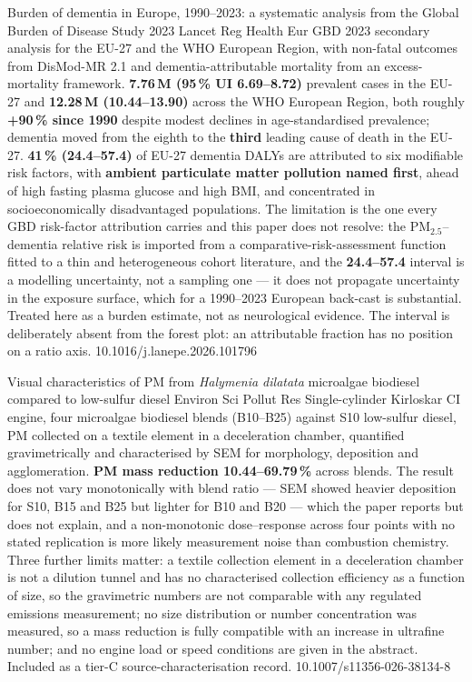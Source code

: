 \documentclass[10pt]{article}
\begin{document}
{Burden of dementia in Europe, 1990--2023: a systematic analysis from the Global Burden of Disease Study 2023}
{Lancet Reg Health Eur}
{GBD 2023 secondary analysis for the EU-27 and the WHO European Region, with non-fatal
outcomes from DisMod-MR 2.1 and dementia-attributable mortality from an excess-mortality
framework. \textbf{7.76\,M (95\,\% UI 6.69--8.72)} prevalent cases in the EU-27 and
\textbf{12.28\,M (10.44--13.90)} across the WHO European Region, both roughly
\textbf{+90\,\% since 1990} despite modest declines in age-standardised prevalence;
dementia moved from the eighth to the \textbf{third} leading cause of death in the EU-27.
\textbf{41\,\% (24.4--57.4)} of EU-27 dementia DALYs are attributed to six modifiable risk
factors, with \textbf{ambient particulate matter pollution named first}, ahead of high
fasting plasma glucose and high BMI, and concentrated in socioeconomically disadvantaged
populations. The limitation is the one every GBD risk-factor attribution carries and this
paper does not resolve: the PM$_{2.5}$--dementia relative risk is imported from a
comparative-risk-assessment function fitted to a thin and heterogeneous cohort literature,
and the \textbf{24.4--57.4} interval is a modelling uncertainty, not a sampling one --- it
does not propagate uncertainty in the exposure surface, which for a 1990--2023 European
back-cast is substantial. Treated here as a burden estimate, not as neurological evidence.
The interval is deliberately absent from the forest plot: an attributable fraction has no
position on a ratio axis.}
{10.1016/j.lanepe.2026.101796}

{Visual characteristics of PM from \textit{Halymenia dilatata} microalgae biodiesel compared to low-sulfur diesel}
{Environ Sci Pollut Res}
{Single-cylinder Kirloskar CI engine, four microalgae biodiesel blends (B10--B25) against
S10 low-sulfur diesel, PM collected on a textile element in a deceleration chamber,
quantified gravimetrically and characterised by SEM for morphology, deposition and
agglomeration. \textbf{PM mass reduction 10.44--69.79\,\%} across blends. The result does
not vary monotonically with blend ratio --- SEM showed heavier deposition for S10, B15 and
B25 but lighter for B10 and B20 --- which the paper reports but does not explain, and a
non-monotonic dose--response across four points with no stated replication is more likely
measurement noise than combustion chemistry. Three further limits matter: a textile
collection element in a deceleration chamber is not a dilution tunnel and has no
characterised collection efficiency as a function of size, so the gravimetric numbers are
not comparable with any regulated emissions measurement; no size distribution or number
concentration was measured, so a mass reduction is fully compatible with an increase in
ultrafine number; and no engine load or speed conditions are given in the abstract.
Included as a tier-C source-characterisation record.}
{10.1007/s11356-026-38134-8}
\end{document}

